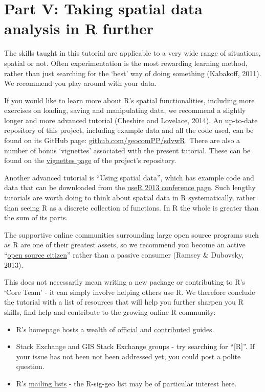\documentclass[]{article}
\begin{document}
\clearpage

\section{Part V: Taking spatial data analysis in R
further}\label{part-v-taking-spatial-data-analysis-in-r-further}

The skills taught in this tutorial are applicable to a very wide range
of situations, spatial or not. Often experimentation is the most
rewarding learning method, rather than just searching for the `best' way
of doing something (Kabakoff, 2011). We recommend you play around with
your data.

If you would like to learn more about R's spatial functionalities,
including more exercises on loading, saving and manipulating data, we
recommend a slightly longer and more advanced tutorial (Cheshire and
Lovelace, 2014). An up-to-date repository of this project, including
example data and all the code used, can be found on its GitHub page:
\href{https://github.com/geocomPP/sdvwR}{github.com/geocomPP/sdvwR}.
There are also a number of bonus `vignettes' associated with the present
tutorial. These can be found on the
\href{https://github.com/Robinlovelace/Creating-maps-in-R/tree/master/vignettes}{vignettes
page} of the project's repository.

Another advanced tutorial is ``Using spatial data'', which has example
code and data that can be downloaded from the
\href{http://www.edii.uclm.es/~useR-2013//Tutorials/Bivand.html}{useR
2013 conference page}. Such lengthy tutorials are worth doing to think
about spatial data in R systematically, rather than seeing R as a
discrete collection of functions. In R the whole is greater than the sum
of its parts.

The supportive online communities surrounding large open source programs
such as R are one of their greatest assets, so we recommend you become
an active
``\href{http://blog.cleverelephant.ca/2013/10/being-open-source-citizen.html}{open
source citizen}'' rather than a passive consumer (Ramsey \& Dubovsky,
2013).

This does not necessarily mean writing a new package or contributing to
R's `Core Team' - it can simply involve helping others use R. We
therefore conclude the tutorial with a list of resources that will help
you further sharpen you R skills, find help and contribute to the
growing online R community:

\begin{itemize}
\itemsep1pt\parskip0pt
\item
  R's homepage hosts a wealth of
  \href{http://cran.r-project.org/manuals.html}{official} and
  \href{http://cran.r-project.org/other-docs.html}{contributed} guides.
\item
  Stack Exchange and GIS Stack Exchange groups - try searching for
  ``{[}R{]}''. If your issue has not been not been addressed yet, you
  could post a polite question.
\item
  R's \href{http://www.r-project.org/mail.html}{mailing lists} - the
  R-sig-geo list may be of particular interest here.
\end{itemize}
\end{document}
